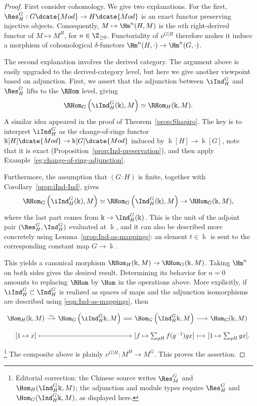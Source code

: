 \begin{proof}
	First consider cohomology. We give two explanations. For the first,
	$\Res^G_H:G\dcate{Mod}\to H\dcate{Mod}$ is an exact functor preserving
	injective objects. Consequently, $M\mapsto\Hm^n(H,M)$ is the $n$th
	right-derived functor of $M\mapsto M^H$, for $n\in\Z_{\geq0}$.
	Functoriality of $\nu^{G|H}$ therefore makes it induce a morphism of
	cohomological $\delta$-functors
	$\Hm^n(H,\cdot)\to\Hm^n(G,\cdot)$.

	The second explanation involves the derived category. The argument above
	is easily upgraded to the derived-category level, but here we give another
	viewpoint based on adjunction. First, we assert that the adjunction between
	$\iInd^G_H$ and $\Res^G_H$ lifts to the $\RHom$ level, giving
	\[ \RHom_G\left(\iInd^G_H(\Bbbk), M\right) \simeq \RHom_H(\Bbbk, M). \]
	A similar idea appeared in the proof of Theorem~\ref{prop:Shapiro}. The key
	is to interpret $\iInd^G_H$ as the change-of-rings functor
	$\Bbbk[H]\dcate{Mod}\to\Bbbk[G]\dcate{Mod}$ induced by
	$\Bbbk[H]\to\Bbbk[G]$, note that it is exact
	(Proposition~\ref{prop:Ind-preservation}), and then apply
	Example~\ref{eg:change-of-ring-adjunction}.

	Furthermore, the assumption that $(G:H)$ is finite, together with
	Corollary~\ref{prop:iInd-Ind}, gives
	\[ \RHom_G\left(\iInd^G_H(\Bbbk), M\right) \simeq \RHom_G\left( \Ind^G_H(\Bbbk), M \right) \to \RHom_G(\Bbbk, M), \]
	where the last part comes from $\Bbbk\to\Ind^G_H(\Bbbk)$. This is the
	unit of the adjoint pair $(\Res^G_H,\Ind^G_H)$ evaluated at $\Bbbk$, and
	it can also be described more concretely using
	Lemma~\ref{prop:Ind-as-mappings}: an element $t\in\Bbbk$ is sent to the
	corresponding constant map $G\to\Bbbk$.

	This yields a canonical morphism
	$\RHom_H(\Bbbk,M)\to\RHom_G(\Bbbk,M)$. Taking $\Hm^n$ on both sides gives
	the desired result. Determining its behavior for $n=0$ amounts to
	replacing $\RHom$ by $\Hom$ in the operations above. More explicitly, if
	$\iInd^G_H\subset\Ind^G_H$ is realized as spaces of maps and the adjunction
	isomorphisms are described using \eqref{eqn:Ind-as-mappings}, then
	\[\begin{tikzcd}[row sep=tiny, column sep=small]
		\Hom_H(\Bbbk, M) \arrow[r, "\sim"] & \Hom_G\left(\iInd^G_H \Bbbk, M\right) \arrow[equal, r] & \Hom_G\left(\Ind^G_H \Bbbk, M\right) \arrow[r] & \Hom_G(\Bbbk, M) \\
		{[1 \mapsto x]} \arrow[mapsto, rr] & & {[f \mapsto \sum_{gH} f(g^{-1}) gx]} \arrow[mapsto, r] & {[1 \mapsto \sum_{gH} gx]}.
	\end{tikzcd}\]
	\footnote{Editorial correction: the Chinese source writes $\Res^G_M$ and
	$\Hom_H(\Ind^G_H\Bbbk,M)$; the adjunction and module types require
	$\Res^G_H$ and $\Hom_G(\Ind^G_H\Bbbk,M)$, as displayed here.}
	The composite above is plainly $\nu^{G|H}:M^H\to M^G$. This proves the
	assertion.
\end{proof}

